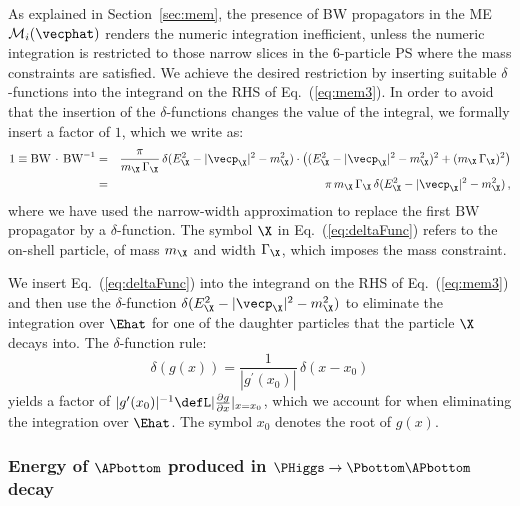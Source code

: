 As explained in Section~\ref{sec:mem},
the presence of BW propagators in the ME $\mathcal{M}_{i}(\vecphat)$ renders the numeric integration inefficient,
unless the numeric integration is restricted to those narrow slices in the $6$-particle PS where the mass constraints are satisfied.
We achieve the desired restriction by inserting suitable $\delta$-functions into the integrand on the RHS of Eq.~(\ref{eq:mem3}).
In order to avoid that the insertion of the $\delta$-functions changes the value of the integral,
we formally insert a factor of $1$, which we write as:
\begin{eqnarray}
1 \equiv \textrm{BW} \, \cdot \, \textrm{BW}^{-1} 
 & = & \frac{\pi}{m_{\X} \, \Gamma_{\X}} \, \delta( E_{\X}^{2} - |\vecp_{\X}|^{2} - m_{\X}^{2} ) \cdot 
\left( (E_{\X}^{2} - |\vecp_{\X}|^{2} - m_{\X}^{2})^{2} + (m_{\X} \, \Gamma_{\X})^{2} \right) \nonumber \\
 & = & \pi \, m_{\X} \, \Gamma_{\X} \, \delta( E_{\X}^{2} - |\vecp_{\X}|^{2} - m_{\X}^{2} ) \, ,
\label{eq:deltaFunc}
\end{eqnarray}
where we have used the narrow-width approximation to replace the first $\textrm{BW}$ propagator by a $\delta$-function.
The symbol $\X$ in Eq.~(\ref{eq:deltaFunc}) refers to the on-shell particle, of mass $m_{\X}$ and width $\Gamma_{\X}$, which imposes the mass constraint.

We insert Eq.~(\ref{eq:deltaFunc}) into the integrand on the RHS of Eq.~(\ref{eq:mem3})
and then use the $\delta$-function $\delta( E_{\X}^{2} - |\vecp_{\X}|^{2} - m_{\X}^{2} )$ 
to eliminate the integration over $\Ehat$ for one of the daughter particles that the particle $\X$ decays into.
The $\delta$-function rule:
\begin{equation} 
\delta\left( g(x) \right) = \frac{1}{|g^{\prime}(x_{0})|} \, \delta( x - x_{0} ) 
\label{eq:deltaFuncRule}
\end{equation}
yields a factor of $|g^{\prime}(x_{0})|^{-1} \defL \lvert \frac{\partial g}{\partial x} \rvert_{x = x_{0}}$, 
which we account for when eliminating the integration over $\Ehat$.
The symbol $x_{0}$ denotes the root of $g(x)$. 


\subsubsection{Energy of $\APbottom$ produced in $\PHiggs \to \Pbottom\APbottom$ decay}
\label{sec:appendix_bEn_Hbb}

